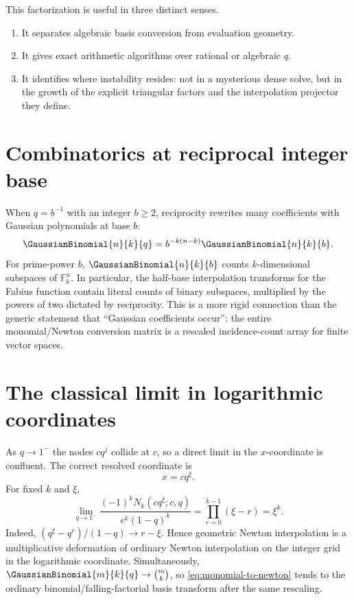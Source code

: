 \documentclass[11pt,oneside]{book}
\numberwithin{equation}{chapter}
\theoremstyle{definition}
\theoremstyle{remark}
\begin{document}
This factorization is useful in three distinct senses.
\begin{enumerate}
\item It separates algebraic basis conversion from evaluation geometry.
\item It gives exact arithmetic algorithms over rational or algebraic $q$.
\item It identifies where instability resides: not in a mysterious dense
      solve, but in the growth of the explicit triangular factors and the
      interpolation projector they define.
\end{enumerate}

\section{Combinatorics at reciprocal integer base}

When $q=b^{-1}$ with an integer $b\ge2$, reciprocity rewrites many
coefficients with Gaussian polynomials at base $b$:
\begin{equation}
 \GaussianBinomial{n}{k}{q}=b^{-k(n-k)}\GaussianBinomial{n}{k}{b}.
 \label{eq:reciprocal-integer-base}
\end{equation}
For prime-power $b$, $\GaussianBinomial{n}{k}{b}$ counts $k$-dimensional subspaces of
$\mathbb F_b^n$.  In particular, the half-base interpolation transforms for
the Fabius function contain literal counts of binary subspaces, multiplied
by the powers of two dictated by reciprocity.  This is a more rigid
connection than the generic statement that ``Gaussian coefficients occur'':
the entire monomial/Newton conversion matrix is a rescaled incidence-count
array for finite vector spaces.

\section{The classical limit in logarithmic coordinates}
\label{sec:q-to-one}

As $q\to1^-$ the nodes $cq^j$ collide at $c$, so a direct limit in the
$x$-coordinate is confluent.  The correct resolved coordinate is
\begin{equation}
 x=cq^\xi.
 \label{eq:log-coordinate}
\end{equation}
For fixed $k$ and $\xi$,
\begin{equation}
 \lim_{q\to1^-}
 \frac{(-1)^kN_k(cq^\xi;c,q)}{c^k(1-q)^k}
 =\prod_{r=0}^{k-1}(\xi-r)=\xi^{\underline{k}}.
 \label{eq:q-to-one-falling}
\end{equation}
Indeed, $(q^\xi-q^r)/(1-q)\to r-\xi$.  Hence geometric Newton interpolation
is a multiplicative deformation of ordinary Newton interpolation on the
integer grid in the logarithmic coordinate.  Simultaneously,
$\GaussianBinomial{m}{k}{q}\to\binom mk$, so
\eqref{eq:monomial-to-newton} tends to the ordinary binomial/falling-factorial
basis transform after the same rescaling.
\end{document}
